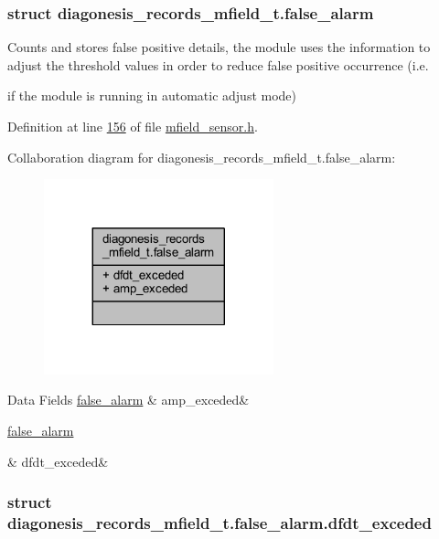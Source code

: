 \subsubsection{struct diagonesis\+\_\+records\+\_\+mfield\+\_\+t.\+false\+\_\+alarm}
Counts and stores false positive details, the module uses the information to adjust the threshold values in order to reduce false positive occurrence (i.\+e. 

if the module is running in automatic adjust mode) 

Definition at line \hyperlink{a00019_source_l00156}{156} of file \hyperlink{a00019_source}{mfield\+\_\+sensor.\+h}.



Collaboration diagram for diagonesis\+\_\+records\+\_\+mfield\+\_\+t.\+false\+\_\+alarm\+:\nopagebreak
\begin{figure}[H]
\begin{center}
\leavevmode
\includegraphics[width=188pt]{da/d45/a00961}
\end{center}
\end{figure}
\begin{DoxyFields}{Data Fields}
\hypertarget{a00019_a354a257167178900099e74081c572fda}{\hyperlink{a00019_d9/d0a/a00390}{false\+\_\+alarm}}\label{a00019_a354a257167178900099e74081c572fda}
&
amp\+\_\+exceded&
\\
\hline

\hypertarget{a00019_a5dbdfe8398b5364ba1cbc50aa1323b8f}{\hyperlink{a00019_db/d95/a00391}{false\+\_\+alarm}}\label{a00019_a5dbdfe8398b5364ba1cbc50aa1323b8f}
&
dfdt\+\_\+exceded&
\\
\hline

\end{DoxyFields}
\label{db/d95/a00391}
\hypertarget{a00019_db/d95/a00391}{}
\subsubsection{struct diagonesis\+\_\+records\+\_\+mfield\+\_\+t.\+false\+\_\+alarm.\+dfdt\+\_\+exceded}


